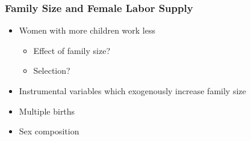 \documentclass[pdftex]{beamer}
\begin{document}
 
 \begin{frame}
\frametitle{Family Size and Female Labor Supply}

\begin{itemize}
\item Women with more children work less
	\begin{itemize}
		\item Effect of family size?
		\item Selection?
	\end{itemize}
\item Instrumental variables which exogenously increase family size
\item Multiple births 
\item Sex composition
\end{itemize}

\end{frame}
\end{document}

